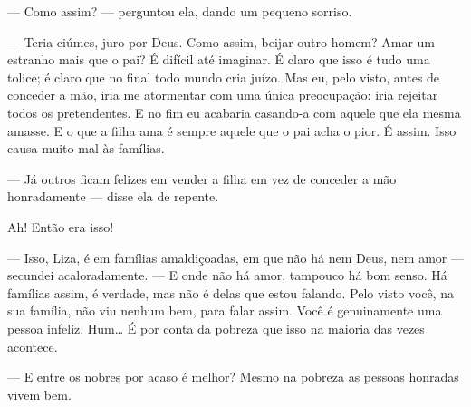 --- Como assim? --- perguntou ela, dando um pequeno sorriso.

--- Teria ciúmes, juro por Deus. Como assim, beijar outro homem? Amar um
estranho mais que o pai? É difícil até imaginar. É claro que isso é
tudo uma tolice; é claro que no final todo mundo cria juízo. Mas eu,
pelo visto, antes de conceder a mão, iria me atormentar com uma única
preocupação: iria rejeitar todos os pretendentes. E no fim eu acabaria
casando-a com aquele que ela mesma amasse. E o que a filha ama é sempre
aquele que o pai acha o pior. É assim. Isso causa muito mal às
famílias.

--- Já outros ficam felizes em vender a filha em vez de conceder a mão
honradamente --- disse ela de repente.

Ah! Então era isso!

--- Isso, Liza, é em famílias amaldiçoadas, em que não há nem Deus, nem
amor --- secundei acaloradamente. --- E onde não há amor, tampouco há bom
senso. Há famílias assim, é verdade, mas não é delas que estou falando.
Pelo visto você, na sua família, não viu nenhum bem, para falar
assim. Você é genuinamente uma pessoa infeliz. Hum\ldots{} É por conta da
pobreza que isso na maioria das vezes acontece.

--- E entre os nobres por acaso é melhor? Mesmo na pobreza as pessoas
honradas vivem bem.

